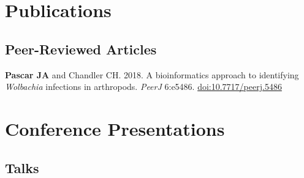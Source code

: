 \documentclass[12pt,letterpaper]{report}
\newcommand{\listitemspace}{0.15em}
\renewenvironment{itemize}
{\begin{list}{}{\setlength{\leftmargin}{0em}
            \setlength{\parskip}{0em}
            \setlength{\itemsep}{\listitemspace}
            \setlength{\parsep}{\listitemspace}}}
    {\end{list}}
\begin{document}
    \section*{Publications}

    \subsection*{Peer-Reviewed Articles}

    \begin{itemize}
    	
    	\item[1.] \textbf{Pascar JA} and Chandler CH. 2018. A bioinformatics approach to identifying {{\emph{Wolbachia}}} infections in arthropods. \textit{PeerJ} 6:e5486. \href{https://doi.org/10.7717/peerj.5486}{doi:10.7717/peerj.5486}
    	
    \end{itemize}

    
    	
    	

    \section*{Conference Presentations}

    \subsection*{Talks}
\end{document}
